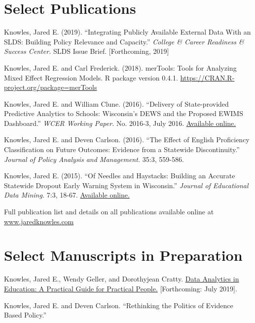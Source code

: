 \documentclass[margin,line]{res}
\begin{document}
\begin{resume}
\section{\sc Select Publications}

Knowles, Jared E. (2019). ``Integrating Publicly Available External Data With an SLDS: Building 
Policy Relevance and Capacity.'' \emph{College & Career Readiness & Success Center.} 
SLDS Issue Brief. [Forthcoming, 2019]

Knowles, Jared E. and Carl Frederick. (2018). merTools: Tools for Analyzing Mixed 
Effect Regression Models. R package version 0.4.1. 
\url{https://CRAN.R-project.org/package=merTools}

Knowles, Jared E. and William Clune. (2016). ``Delivery of State-provided Predictive
Analytics to Schools: Wisconsin’s DEWS and the Proposed EWIMS Dashboard.'' 
\emph{WCER Working Paper.} No. 2016-3, July 2016. \href{http://wcer-web.ad.education.wisc.edu/docs/working-papers/Working_Paper_No_2016_03.pdf}{Available online.}

Knowles, Jared E. and Deven Carlson. (2016). ``The Effect of English Proficiency Classification 
on Future Outcomes: Evidence from a Statewide Discontinuity.'' \emph{Journal of Policy Analysis 
and Management.} 35:3, 559-586. 

Knowles, Jared E. (2015). ``Of Needles and Haystacks: Building an Accurate Statewide 
Dropout Early Warning System in Wisconsin.'' \emph{Journal of Educational Data 
Mining.} 7:3, 18-67. 
\href{http://www.educationaldatamining.org/JEDM/index.php/JEDM/article/view/JEDM082}{Available online.}

Full publication list and details on all publications available online at 
\url{www.jaredknowles.com}

\section{\sc Select Manuscripts in Preparation}

Knowles, Jared E., Wendy Geller, and Dorothyjean Cratty. \uline{Data Analytics in 
Education: A Practical Guide for Practical People.} [Forthcoming: July 2019].

Knowles, Jared E. and Deven Carlson. ``Rethinking the Politics of Evidence Based 
Policy.'' 

\vspace*{5mm}


\end{resume}
\end{document}
